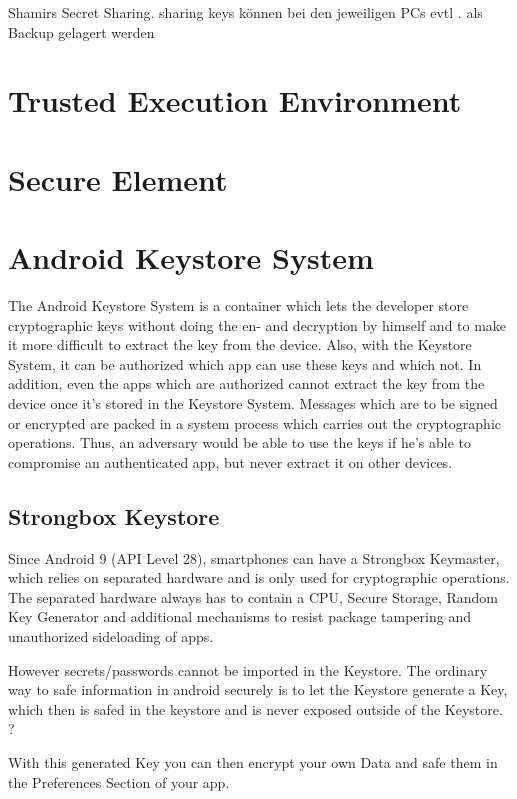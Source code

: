 \documentclass[12pt,twoside,a4paper,parskip]{scrbook}
\begin{document}
Shamirs Secret Sharing. sharing keys können bei den jeweiligen PCs evtl . als Backup gelagert werden

\section{Trusted Execution Environment}

\section{Secure Element}

\section{Android Keystore System}

The Android Keystore System is a container which lets the developer store cryptographic keys without doing the en- and decryption by himself and to make it more difficult to extract the key from the device. Also, with the Keystore System, it can be authorized which app can use these keys and which not. In addition, even the apps which are authorized cannot extract the key from the device once it's stored in the Keystore System. Messages which are to be signed or encrypted are packed in a system process which carries out the cryptographic operations. Thus, an adversary would be able to use the keys if he's able to compromise an authenticated app, but never extract it on other devices.

\subsection{Strongbox Keystore}

Since Android 9 (API Level 28), smartphones can have a Strongbox Keymaster, which relies on separated hardware and is only used for cryptographic operations.
The separated hardware always has to contain a CPU, Secure Storage, Random Key Generator and additional mechanisms to resist package tampering and unauthorized sideloading of apps.

However secrets/passwords cannot be imported in the Keystore. The ordinary way to safe information in android securely is to let the Keystore generate a Key, which then 
is safed in the keystore and is never exposed outside of the Keystore. ? 

With this generated Key you can then encrypt your own Data and safe them in the Preferences Section of your app.
\end{document}
